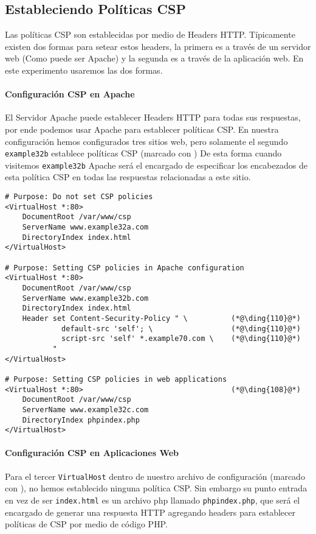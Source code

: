 \subsection{Estableciendo Políticas CSP}  

Las políticas CSP son establecidas por medio de Headers HTTP. Típicamente existen dos formas para setear estos headers, la primera es a través de un servidor web (Como puede ser Apache) y la segunda es a través de la aplicación web.
En este experimento usaremos las dos formas.

\paragraph{Configuración CSP en Apache}
El Servidor Apache puede establecer Headers HTTP para todas sus respuestas, por ende podemos usar Apache para establecer políticas CSP. En nuestra configuración hemos configurados tres sitios web, pero solamente el segundo \texttt{example32b}  establece políticas CSP (marcado con )
De esta forma cuando visitemos  \texttt{example32b} Apache será el encargado de especificar los encabezados de esta política CSP en todas las respuestas relacionadas a este sitio.


\begin{lstlisting}
# Purpose: Do not set CSP policies
<VirtualHost *:80>
    DocumentRoot /var/www/csp
    ServerName www.example32a.com
    DirectoryIndex index.html
</VirtualHost>

# Purpose: Setting CSP policies in Apache configuration
<VirtualHost *:80>
    DocumentRoot /var/www/csp
    ServerName www.example32b.com
    DirectoryIndex index.html
    Header set Content-Security-Policy " \          (*@\ding{110}@*)
             default-src 'self'; \                  (*@\ding{110}@*)
             script-src 'self' *.example70.com \    (*@\ding{110}@*)
           "
</VirtualHost>

# Purpose: Setting CSP policies in web applications
<VirtualHost *:80>                                  (*@\ding{108}@*)
    DocumentRoot /var/www/csp
    ServerName www.example32c.com
    DirectoryIndex phpindex.php
</VirtualHost>
\end{lstlisting}
 

\paragraph{Configuración CSP en Aplicaciones Web}
Para el tercer \texttt{VirtualHost} dentro de nuestro archivo de configuración (marcado con ), no hemos establecido ninguna política CSP.
Sin embargo su punto entrada en vez de ser \texttt{index.html} es un archivo php llamado  \texttt{phpindex.php}, que será el encargado de generar una respuesta HTTP agregando headers para establecer políticas de CSP por medio de código PHP.

